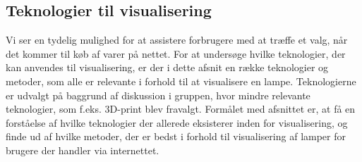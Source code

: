 




\subsection{Teknologier til visualisering}
Vi ser en tydelig mulighed for at assistere forbrugere med at træffe et valg, når det kommer til køb af varer på nettet. For at undersøge hvilke teknologier, der kan anvendes til visualisering, er der i dette afsnit en række teknologier og metoder, som alle er relevante i forhold til at visualisere en lampe. Teknologierne er udvalgt på baggrund af diskussion i gruppen, hvor mindre relevante teknologier, som f.eks. 3D-print blev fravalgt. Formålet med afsnittet er, at få en forståelse af hvilke teknologier der allerede eksisterer inden for visualisering, og finde ud af hvilke metoder, der er bedst i forhold til visualisering af lamper for brugere der handler via internettet.

